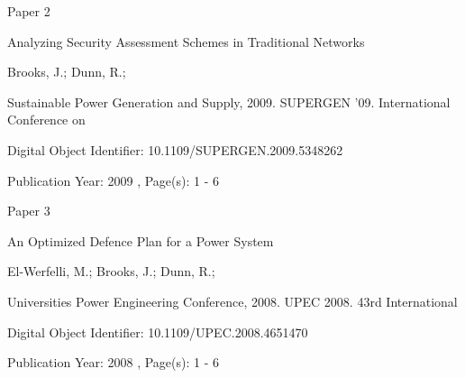 \documentclass[a4paper,oneside,12pt]{report}
\begin{document}



\begin{center}\begin{large}
{\Huge Paper 2}
\vspace{40px}

Analyzing Security Assessment Schemes in Traditional Networks
\vspace{40px}

Brooks, J.; Dunn, R.;
\vspace{40px}

Sustainable Power Generation and Supply, 2009. SUPERGEN '09. International Conference on
\vspace{60px}

Digital Object Identifier: 10.1109/SUPERGEN.2009.5348262

Publication Year: 2009 , Page(s): 1 - 6
\end{large}\end{center}




\begin{center}\begin{large}
{\Huge Paper 3}
\vspace{40px}

An Optimized Defence Plan for a Power System
\vspace{40px}

El-Werfelli, M.; Brooks, J.; Dunn, R.;
\vspace{40px}

Universities Power Engineering Conference, 2008. UPEC 2008. 43rd International
\vspace{40px}

Digital Object Identifier: 10.1109/UPEC.2008.4651470

Publication Year: 2008 , Page(s): 1 - 6
\end{large}\end{center}



\end{document}
